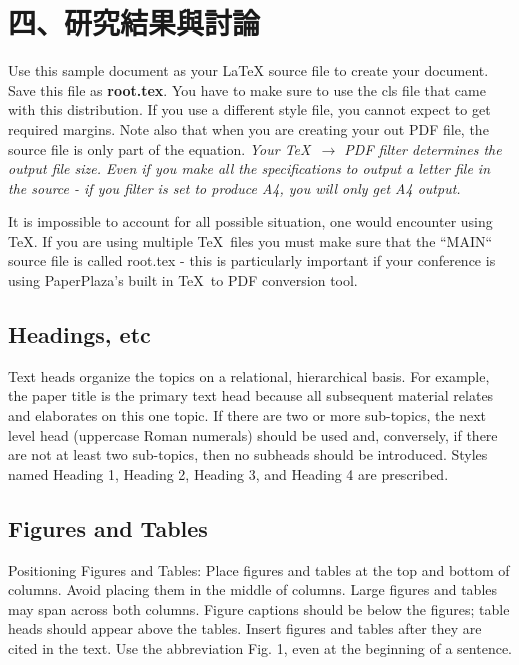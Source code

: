 \documentclass[letterpaper, 10pt, conference]{ieeeconf}   %
\begin{document}
\begin{CJK*}{UTF8}{bsmi}
\begin{itemize}
\end{itemize}

\section*{四、研究結果與討論}

Use this sample document as your LaTeX source file to create your document. Save this file as {\bf root.tex}. You have to make sure to use the cls file that came with this distribution. If you use a different style file, you cannot expect to get required margins. Note also that when you are creating your out PDF file, the source file is only part of the equation. {\it Your \TeX\ $\rightarrow$ PDF filter determines the output file size. Even if you make all the specifications to output a letter file in the source - if you filter is set to produce A4, you will only get A4 output. }

It is impossible to account for all possible situation, one would encounter using \TeX. If you are using multiple \TeX\ files you must make sure that the ``MAIN`` source file is called root.tex - this is particularly important if your conference is using PaperPlaza's built in \TeX\ to PDF conversion tool.

\subsection{Headings, etc}

Text heads organize the topics on a relational, hierarchical basis. For example, the paper title is the primary text head because all subsequent material relates and elaborates on this one topic. If there are two or more sub-topics, the next level head (uppercase Roman numerals) should be used and, conversely, if there are not at least two sub-topics, then no subheads should be introduced. Styles named Heading 1, Heading 2, Heading 3, and Heading 4 are prescribed.

\subsection{Figures and Tables}

Positioning Figures and Tables: Place figures and tables at the top and bottom of columns. Avoid placing them in the middle of columns. Large figures and tables may span across both columns. Figure captions should be below the figures; table heads should appear above the tables. Insert figures and tables after they are cited in the text. Use the abbreviation Fig. 1, even at the beginning of a sentence.


\end{CJK*}
\end{document}
